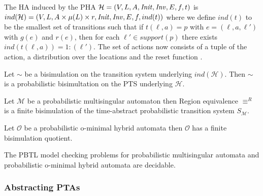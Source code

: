 The HA induced by the PHA $\mathcal{H}=(V,L,A,\mathit{Init},\mathit{Inv},E,f,t)$ is $ind(\mathcal{H})=(V,L,A\times \mu(L)\times r,\mathit{Init},\mathit{Inv},E,f,ind(t))$ where we define $ind(t)$ to be the smallest set of transitions such that if $t(\ell,a)=p$ with $e=(\ell,a,\ell')$ with $g(e)$ and $r(e)$, then for each $\ell'\in support(p)$ there exists $ind(t(\ell,a))=1:(\ell')$.
The set of actions now consists of a tuple of the action, a distribution over the locations and the reset function \cite{Sproston2014}.


\begin{prop}
Let $\sim$ be a bisimulation on the transition system underlying $ind(\mathcal{H})$. Then $\sim$ is a probabilistic bisimultation on the PTS underlying $\mathcal{H}$.
\end{prop}

\begin{lem}
Let $\mathcal{M}$ be a probabilistic multisingular automaton then Region equivalence $\equiv^{R}$ is a finite bisimulation of the time-abstract probabilistic transition system $S_\mathcal{M}$.
\end{lem}


\begin{lem}
Let $\mathcal{O}$ be a probabilistic o-minimal hybrid automata then $\mathcal{O}$ has a finite bisimulation quotient.
\end{lem}

\begin{cor}
The PBTL model checking problems for probabilistic multisingular automata and probabilistic o-minimal hybrid automata are decidable.
\end{cor}

\subsubsection{Abstracting PTAs}
\label{sec:dpta}


